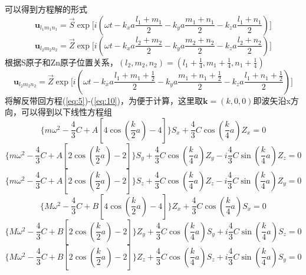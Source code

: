 \documentclass{article}
\begin{document}
可以得到方程解的形式
\begin{equation}
	\boldsymbol{u}_{l_1m_1n_1}=\vec{S}\exp\big[i(\omega t-k_xa\frac{l_1+m_1}{2}-k_ya\frac{m_1+n_1}{2}-k_za\frac{l_1+n_1}{2})\big]
\end{equation}
\begin{equation}
	\boldsymbol{u}_{l_2m_2n_2}=\vec{Z}\exp\big[i(\omega t-k_xa\frac{l_2+m_2}{2}-k_ya\frac{m_2+n_2}{2}-k_za\frac{l_2+n_2}{2})\big]
\end{equation}
根据S原子和Zn原子位置关系，$ (l_2,m_2,n_2)=(l_1+\frac{1}{4},m_1+\frac{1}{4},n_1+\frac{1}{4}) $
\begin{equation}
	\boldsymbol{u}_{l_2m_2n_2}=\vec{Z}\exp\big[i(\omega t-k_xa\frac{l_1+m_1+\frac{1}{2}}{2}-k_ya\frac{m_1+n_1+\frac{1}{2}}{2}-k_za\frac{l_1+n_1+\frac{1}{2}}{2})\big]
\end{equation}
将解反带回方程(\ref{eq:5})-(\ref{eq:10})，为便于计算，这里取$ \boldsymbol{k}=(k,0,0) $即波矢沿x方向，可以得到以下线性方程组
\begin{equation}
	\big\{m\omega^2-\frac{4}{3}C+A[4\cos(\frac{k}{2}a)-4]\big\}S_x+\frac{4}{3}C\cos(\frac{k}{4}a)Z_x=0
\end{equation}
\begin{equation}
	\big\{m\omega^2-\frac{4}{3}C+A[2\cos(\frac{k}{2}a)-2]\big\}S_y+\frac{4}{3}C\cos(\frac{k}{4}a)Z_y-i\frac{4}{3}C\sin(\frac{k}{4}a)Z_z=0
\end{equation}
\begin{equation}
	\big\{m\omega^2-\frac{4}{3}C+A[2\cos(\frac{k}{2}a)-2]\big\}S_z+\frac{4}{3}C\cos(\frac{k}{4}a)Z_z-i\frac{4}{3}C\sin(\frac{k}{4}a)Z_y=0
\end{equation}
\begin{equation}
	\big\{M\omega^2-\frac{4}{3}C+B[4\cos(\frac{k}{2}a)-4]\big\}Z_x+\frac{4}{3}C\cos(\frac{k}{4}a)S_x=0
\end{equation}
\begin{equation}
	\big\{M\omega^2-\frac{4}{3}C+B[2\cos(\frac{k}{2}a)-2]\big\}Z_y+\frac{4}{3}C\cos(\frac{k}{4}a)S_y+i\frac{4}{3}C\sin(\frac{k}{4}a)S_z=0
\end{equation}
\begin{equation}
	\big\{M\omega^2-\frac{4}{3}C+B[2\cos(\frac{k}{2}a)-2]\big\}Z_z+\frac{4}{3}C\cos(\frac{k}{4}a)S_z+i\frac{4}{3}C\sin(\frac{k}{4}a)S_y=0
\end{equation}
\end{document}
